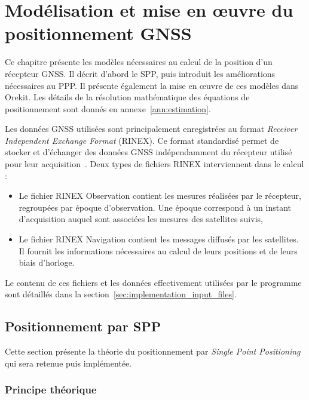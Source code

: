 \chapter{Modélisation et mise en œuvre du positionnement GNSS}
\label{chap:modelisation}

Ce chapitre présente les modèles nécessaires au calcul de la position d'un
récepteur GNSS. Il décrit d'abord le SPP, puis introduit les améliorations
nécessaires au PPP. Il présente également la mise en œuvre de ces modèles dans
Orekit.
Les détails de la résolution mathématique des équations de positionnement sont donnés en annexe~\ref{ann:estimation}.

Les données GNSS utilisées sont principalement enregistrées
au format \emph{Receiver Independent Exchange Format} (RINEX). Ce format
standardisé permet de stocker et d'échanger des données GNSS indépendamment du
récepteur utilisé pour leur acquisition~\cite{rinex304}. Deux types de fichiers
RINEX interviennent dans le calcul :

\begin{itemize}
    \item Le fichier RINEX Observation contient les mesures réalisées par le
    récepteur, regroupées par époque d'observation. Une époque correspond à un
    instant d'acquisition auquel sont associées les mesures des satellites
    suivis,
    \item Le fichier RINEX Navigation contient les messages diffusés par les
    satellites. Il fournit les informations nécessaires au calcul de
    leurs positions et de leurs biais d'horloge.
\end{itemize}

Le contenu de ces fichiers et les données effectivement utilisées par le
programme sont détaillés dans la section~\ref{sec:implementation_input_files}.

\section{Positionnement par SPP}

Cette section présente la théorie du positionnement par \emph{Single Point Positioning} qui sera retenue puis implémentée.

\subsection{Principe théorique}

